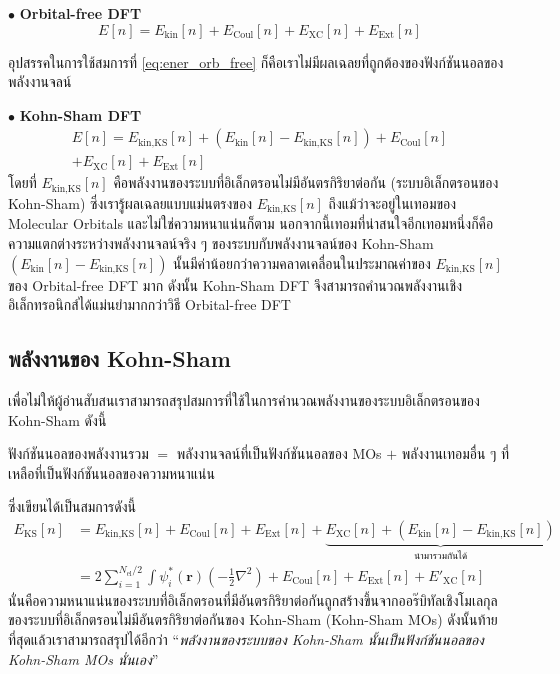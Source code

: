 \noindent $\bullet$ \textbf{Orbital-free DFT}
%
\begin{equation}\label{eq:ener_orb_free}
    E[n] = E_{\text{kin}}[n] + E_{\text{Coul}}[n] + E_{\text{XC}}[n] + E_{\text{Ext}}[n]
\end{equation}

\noindent อุปสรรคในการใช้สมการที่ \eqref{eq:ener_orb_free} ก็คือเราไม่มีผลเฉลยที่ถูกต้องของฟังก์ชันนอลของพลังงานจลน์

\noindent $\bullet$ \textbf{Kohn-Sham DFT}
%
\begin{multline}\label{eq:ener_kohn_sham}
    E[n] = E_{\text{kin,KS}}[n] + (E_{\text{kin}}[n] - E_{\text{kin,KS}}[n]) + E_{\text{Coul}}[n] \\
    + E_{\text{XC}}[n] + E_{\text{Ext}}[n]
\end{multline}
%
\noindent โดยที่ $E_{\text{kin,KS}}[n]$ คือพลังงานของระบบที่อิเล็กตรอนไม่มีอันตรกิริยาต่อกัน (ระบบอิเล็กตรอนของ Kohn-Sham) ซึ่งเรารู้ผลเฉลยแบบแม่นตรงของ $E_{\text{kin,KS}}[n]$ ถึงแม้ว่าจะอยู่ในเทอมของ Molecular Orbitals และไม่ใช่ความหนาแน่นก็ตาม นอกจากนี้เทอมที่น่าสนใจอีกเทอมหนึ่งก็คือความแตกต่างระหว่างพลังงานจลน์จริง ๆ ของระบบกับพลังงานจลน์ของ Kohn-Sham $(E_{\text{kin}}[n] - E_{\text{kin,KS}}[n])$ นั้นมีค่าน้อยกว่าความคลาดเคลื่อนในประมาณค่าของ $E_{\text{kin,KS}}[n]$ ของ Orbital-free DFT มาก ดังนั้น Kohn-Sham DFT จึงสามารถคำนวณพลังงานเชิงอิเล็กทรอนิกส์ได้แม่นยำมากกว่าวิธี Orbital-free DFT

\subsection{พลังงานของ Kohn-Sham}
\label{ssec:kohn_sham_ener_expr}

เพื่อไม่ให้ผู้อ่านสับสนเราสามารถสรุปสมการที่ใช้ในการคำนวณพลังงานของระบบอิเล็กตรอนของ Kohn-Sham ดังนี้
%
\begin{framed}
    ฟังก์ชันนอลของพลังงานรวม $=$ พลังงานจลน์ที่เป็นฟังก์ชันนอลของ MOs $+$ พลังงานเทอมอื่น ๆ ที่เหลือที่เป็นฟังก์ชันนอลของความหนาแน่น
\end{framed}
%
\noindent ซึ่งเขียนได้เป็นสมการดังนี้
%
\begin{align}
    \label{eq:kohn_sham_ener_1}
    E_{\text{KS}}[n] & = E_{\text{kin,KS}}[n] + E_{\text{Coul}}[n] + E_{\text{Ext}}[n] +
    \underbrace{E_{\text{XC}}[n] + (E_{\text{kin}}[n] - E_{\text{kin,KS}}[n])}_{\text{นำมารวมกันได้}}                           \\
    \label{eq:kohn_sham_ener_2}
                     & = 2 \sum^{N_{\text{el}}/2}_{i=1} \int \psi^{\ast}_{i}(\bm{r}) \left ( -\frac{1}{2}\nabla^{2} \right )
    + E_{\text{Coul}}[n] + E_{\text{Ext}}[n] + {E'}_{\text{XC}}[n]
\end{align}
%
\noindent นั่นคือความหนาแน่นของระบบที่อิเล็กตรอนที่มีอันตรกิริยาต่อกันถูกสร้างขึ้นจากออร๊บิทัลเชิงโมเลกุลของระบบที่อิเล็กตรอนไม่มีอันตรกิริยาต่อกันของ Kohn-Sham (Kohn-Sham MOs) ดังนั้นท้ายที่สุดแล้วเราสามารถสรุปได้อีกว่า \enquote{\textit{พลังงานของระบบของ Kohn-Sham นั้นเป็นฟังก์ชันนอลของ Kohn-Sham MOs นั่นเอง}}

